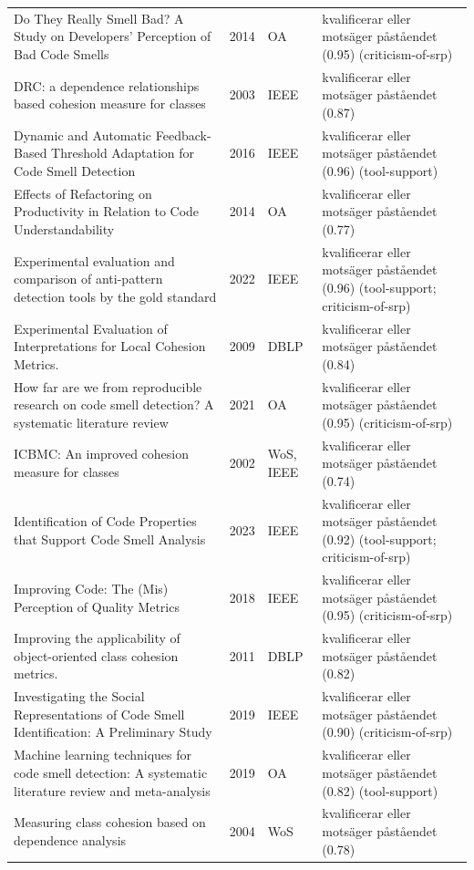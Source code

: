 \begin{longtable}{@{}%
  >{\raggedright\arraybackslash}p{}c%
  >{\raggedright\arraybackslash}p{}%
  >{\raggedright\arraybackslash}p{}@{}}
Do They Really Smell Bad? A Study on Developers' Perception of Bad Code Smells & 2014 & OA & kvalificerar eller motsäger påståendet (0.95) (criticism-of-srp) \\
DRC: a dependence relationships based cohesion measure for classes & 2003 & IEEE & kvalificerar eller motsäger påståendet (0.87) \\
Dynamic and Automatic Feedback-Based Threshold Adaptation for Code Smell Detection & 2016 & IEEE & kvalificerar eller motsäger påståendet (0.96) (tool-support) \\
Effects of Refactoring on Productivity in Relation to Code Understandability & 2014 & OA & kvalificerar eller motsäger påståendet (0.77) \\
Experimental evaluation and comparison of anti-pattern detection tools by the gold standard & 2022 & IEEE & kvalificerar eller motsäger påståendet (0.96) (tool-support; criticism-of-srp) \\
Experimental Evaluation of Interpretations for Local Cohesion Metrics. & 2009 & DBLP & kvalificerar eller motsäger påståendet (0.84) \\
How far are we from reproducible research on code smell detection? A systematic literature review & 2021 & OA & kvalificerar eller motsäger påståendet (0.95) (criticism-of-srp) \\
ICBMC: An improved cohesion measure for classes & 2002 & WoS, IEEE & kvalificerar eller motsäger påståendet (0.74) \\
Identification of Code Properties that Support Code Smell Analysis & 2023 & IEEE & kvalificerar eller motsäger påståendet (0.92) (tool-support; criticism-of-srp) \\
Improving Code: The (Mis) Perception of Quality Metrics & 2018 & IEEE & kvalificerar eller motsäger påståendet (0.95) (criticism-of-srp) \\
Improving the applicability of object-oriented class cohesion metrics. & 2011 & DBLP & kvalificerar eller motsäger påståendet (0.82) \\
Investigating the Social Representations of Code Smell Identification: A Preliminary Study & 2019 & IEEE & kvalificerar eller motsäger påståendet (0.90) (criticism-of-srp) \\
Machine learning techniques for code smell detection: A systematic literature review and meta-analysis & 2019 & OA & kvalificerar eller motsäger påståendet (0.82) (tool-support) \\
Measuring class cohesion based on dependence analysis & 2004 & WoS & kvalificerar eller motsäger påståendet (0.78) \\

\end{longtable}
